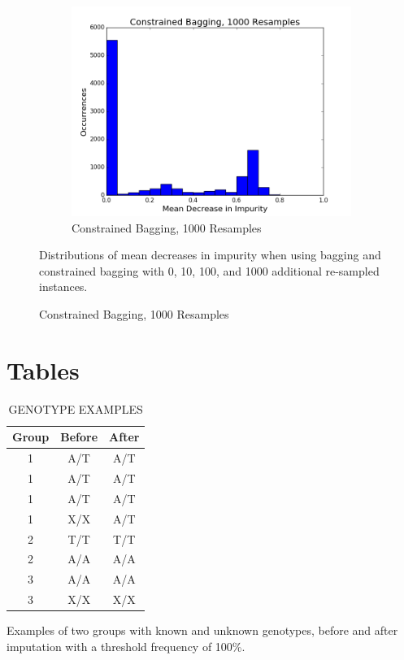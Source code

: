 \begin{figure}[H]
\begin{subfigure}[b]{0.45\textwidth}
    \includegraphics[width=\textwidth]{figures/random_forests/bagging_bias_constrained_bagging_hist_1000.png}
    \caption{Constrained Bagging, 1000 Resamples}
    \label{fig:bagging-bias-constrained-1000}
  \end{subfigure}

  Distributions of mean decreases in impurity when using bagging and constrained bagging with 0, 10, 100, and 1000 additional re-sampled instances.
  \label{fig:bagging-bias}
\end{figure}

\section{Tables}
\begin{table}[H]
  \begin{center}
    \caption{GENOTYPE EXAMPLES}
    \begin{tabular}{ c c c}
      \hline
      \textbf{Group} & \textbf{Before} & \textbf{After}\\ \hline
      1 & A/T & A/T \\
      1 & A/T & A/T \\
      1 & A/T & A/T \\
      1 & X/X & A/T \\
      2 & T/T & T/T \\
      2 & A/A & A/A \\
      3 & A/A & A/A \\
      3 & X/X & X/X \\
    \end{tabular}
  \end{center}
  
  Examples of two groups with known and unknown genotypes, before and after imputation with a threshold frequency of 100\%.
  \label{tab:unknown-genotypes-example}
\end{table}

